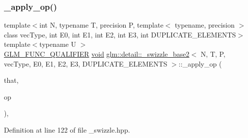\subsubsection{\texorpdfstring{\_apply\_op()}{\_apply\_op()}}
{\footnotesize\ttfamily template$<$int N, typename T, precision P, template$<$ typename, precision $>$ class vec\+Type, int E0, int E1, int E2, int E3, int D\+U\+P\+L\+I\+C\+A\+T\+E\+\_\+\+E\+L\+E\+M\+E\+N\+TS$>$ \\
template$<$typename U $>$ \\
\mbox{\hyperlink{setup_8hpp_a33fdea6f91c5f834105f7415e2a64407}{G\+L\+M\+\_\+\+F\+U\+N\+C\+\_\+\+Q\+U\+A\+L\+I\+F\+I\+ER}} \mbox{\hyperlink{glad_8h_a950fc91edb4504f62f1c577bf4727c29}{void}} \mbox{\hyperlink{structglm_1_1detail_1_1__swizzle__base2}{glm\+::detail\+::\+\_\+swizzle\+\_\+base2}}$<$ N, T, P, vec\+Type, E0, E1, E2, E3, D\+U\+P\+L\+I\+C\+A\+T\+E\+\_\+\+E\+L\+E\+M\+E\+N\+TS $>$\+::\+\_\+apply\+\_\+op (\begin{DoxyParamCaption}\item[{vec\+Type$<$ T, P $>$ const \&}]{that,  }\item[{U}]{op }\end{DoxyParamCaption})\hspace{0.3cm}{\ttfamily [inline]}, {\ttfamily [protected]}}



Definition at line 122 of file \+\_\+swizzle.\+hpp.

\mbox{\label{structglm_1_1detail_1_1__swizzle__base2_aa1f1b42302141930f442c11738e55f66}} 
